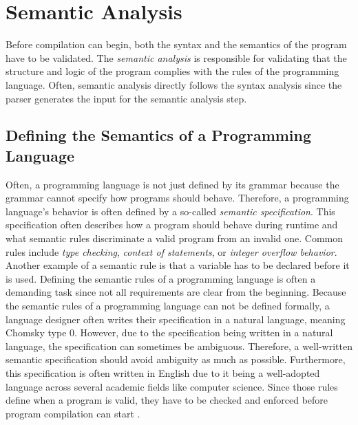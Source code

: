 \section{Semantic Analysis}
Before compilation can begin, both the syntax and the semantics of the program have to be validated.
The \emph{semantic analysis} is responsible for validating that the structure and logic of the program complies with the rules of the programming language.
Often, semantic analysis directly follows the syntax analysis since the parser generates the input for the semantic analysis step.

\subsection{Defining the Semantics of a Programming Language}
Often, a programming language is not just defined by its grammar
because the grammar cannot specify how programs should behave.
Therefore, a programming language's behavior is often defined by a so-called \emph{semantic specification}.
This specification often describes how a program should behave during runtime and what semantic rules discriminate a valid program from an invalid one.
Common rules include \emph{type checking}, \emph{context of statements}, or \emph{integer overflow behavior}.
Another example of a semantic rule is that a variable has to be declared before it is used.
Defining the semantic rules of a programming language is often a demanding task
since not all requirements are clear from the beginning.
Because the semantic rules of a programming language can not be defined formally,
a language designer often writes their specification in a natural language, meaning Chomsky type 0.
However, due to the specification being written in a natural language, the specification can sometimes be ambiguous.
Therefore, a well-written semantic specification should avoid ambiguity as much as possible.
Furthermore, this specification is often written in English
due to it being a well-adopted language across several academic fields like computer science.
Since those rules define when a program is valid, they have to be checked and enforced before program compilation can start
\cite[p.~21]{a_practical_guide_compiler_construction_watson_2017}.

